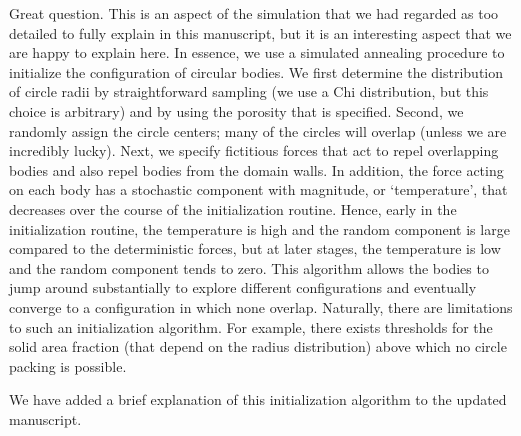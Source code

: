 \documentclass[11pt]{article}
\begin{document}
Great question. This is an aspect of the simulation that we had regarded as too detailed to fully explain in this manuscript, but it is an interesting aspect that we are happy to explain here. In essence, we use a simulated annealing procedure to initialize the configuration of circular bodies. We first determine the distribution of circle radii by straightforward sampling (we use a Chi distribution, but this choice is arbitrary) and by using the porosity that is specified. Second, we randomly assign the circle centers; many of the circles will overlap (unless we are incredibly lucky). Next, we specify fictitious forces that act to repel overlapping bodies and also repel bodies from the domain walls. In addition, the force acting on each body has a stochastic component with magnitude, or `temperature', that decreases over the course of the initialization routine. Hence, early in the initialization routine, the temperature is high and the random component is large compared to the deterministic forces, but at later stages, the temperature is low and the random component tends to zero. This algorithm allows the bodies to jump around substantially to explore different configurations and eventually converge to a configuration in which none overlap. Naturally, there are limitations to such an initialization algorithm. For example, there exists thresholds for the solid area fraction (that depend on the radius distribution) above which no circle packing is possible.

We have added a brief explanation of this initialization algorithm to the updated manuscript.
\end{document}
